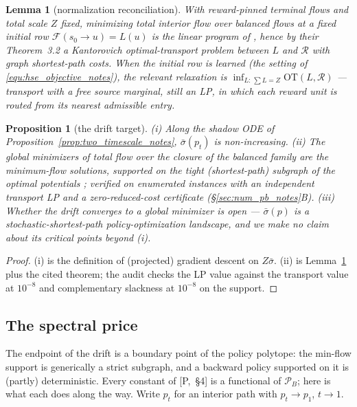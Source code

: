 \documentclass[11pt]{article}
\newtheorem{proposition}[theorem]{Proposition}
\newtheorem{lemma}[theorem]{Lemma}
\theoremstyle{definition}
\theoremstyle{remark}
\begin{document}
\begin{lemma}[normalization reconciliation]\label{lem:normalization_notes}
With reward-pinned terminal flows and total scale $Z$ fixed, minimizing total interior
flow over balanced flows at a \emph{fixed} initial row $\mathcal F(s_0\to u)=L(u)$ is the
linear program of \citet[Eq.~10]{maksimov2026ot}, hence by their Theorem~3.2 a Kantorovich
optimal-transport problem between $L$ and $\mathcal R$ with graph shortest-path costs.
When the initial row is learned (the setting of \eqref{equ:hse_objective_notes}), the relevant
relaxation is $\inf_{L:\,\sum L=Z}\mathrm{OT}(L,\mathcal R)$ --- transport with a free
source marginal, still an LP, in which each reward unit is routed from its nearest
admissible entry.
\end{lemma}

\begin{proposition}[the drift target]\label{prop:drift_target_notes}
(i) Along the shadow ODE of Proposition~\ref{prop:two_timescale_notes}, $\bar\sigma(p_t)$ is
non-increasing. (ii) The global minimizers of total flow over the closure of the balanced
family are the minimum-flow solutions, supported on the tight (shortest-path) subgraph of
the optimal potentials \citep[Thm~3.2--3.3]{maksimov2026ot}; verified on enumerated
instances with an independent transport LP and a zero-reduced-cost certificate
(\S\ref{sec:num_pb_notes}B). (iii) Whether the drift \emph{converges} to a global minimizer is
open --- $\bar\sigma(p)$ is a stochastic-shortest-path policy-optimization landscape,
and we make no claim about its critical points beyond (i).
\end{proposition}

\begin{proof}
(i) is the definition of (projected) gradient descent on $Z\bar\sigma$. (ii) is
Lemma~\ref{lem:normalization_notes} plus the cited theorem; the audit checks the LP value
against the transport value at $10^{-8}$ and complementary slackness at $10^{-8}$ on the
support.
\end{proof}

\subsection{The spectral price}\label{sec:price_notes}

The endpoint of the drift is a boundary point of the policy polytope: the min-flow
support is generically a strict subgraph, and a backward policy supported on it is
(partly) deterministic. Every constant of [P,~\S4] is a functional of $\mathcal P_B$;
here is what each does along the way. Write $p_t$ for an interior path with
$p_t\to p_1$, $t\to1$.
\end{document}

